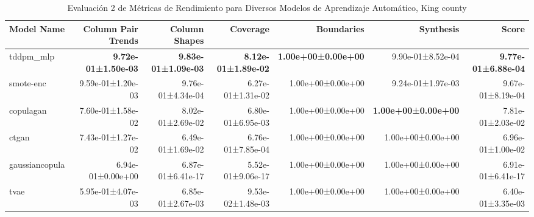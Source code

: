 \begin{table}[H]
\centering
\fontsize{7}{14}\selectfont
\caption{Evaluación 2 de Métricas de Rendimiento para Diversos Modelos de Aprendizaje Automático, King county}
\label{table-score-king county-a}
\begin{tabular}{|l|r|r|r|r|r|r|}
\hline
 \rowcolor[gray]{0.8}
Model Name & Column Pair Trends & Column Shapes & Coverage & Boundaries & Synthesis & \textbf{Score} \\
\hline tddpm\_mlp & \bfseries 9.72e-01±1.50e-03 & \bfseries 9.83e-01±1.09e-03 & \bfseries 8.12e-01±1.89e-02 & \bfseries 1.00e+00±0.00e+00 & 9.90e-01±8.52e-04 & \bfseries 9.77e-01±6.88e-04 \\
\hline smote-enc & 9.59e-01±1.20e-03 & 9.76e-01±4.34e-04 & 6.27e-01±1.31e-02 & 1.00e+00±0.00e+00 & 9.24e-01±1.97e-03 & 9.67e-01±8.19e-04 \\
\hline copulagan & 7.60e-01±1.58e-02 & 8.02e-01±2.69e-02 & 6.80e-01±6.95e-03 & 1.00e+00±0.00e+00 & \bfseries 1.00e+00±0.00e+00 & 7.81e-01±2.03e-02 \\
\hline ctgan & 7.43e-01±1.27e-02 & 6.49e-01±1.69e-02 & 6.76e-01±7.85e-04 & 1.00e+00±0.00e+00 & 1.00e+00±0.00e+00 & 6.96e-01±1.00e-02 \\
\hline gaussiancopula & 6.94e-01±0.00e+00 & 6.87e-01±6.41e-17 & 5.52e-01±9.06e-17 & 1.00e+00±0.00e+00 & 1.00e+00±0.00e+00 & 6.91e-01±6.41e-17 \\
\hline tvae & 5.95e-01±4.07e-03 & 6.85e-01±2.67e-03 & 9.53e-02±1.48e-03 & 1.00e+00±0.00e+00 & 1.00e+00±0.00e+00 & 6.40e-01±3.35e-03 \\
\hline
\end{tabular}
\end{table}
